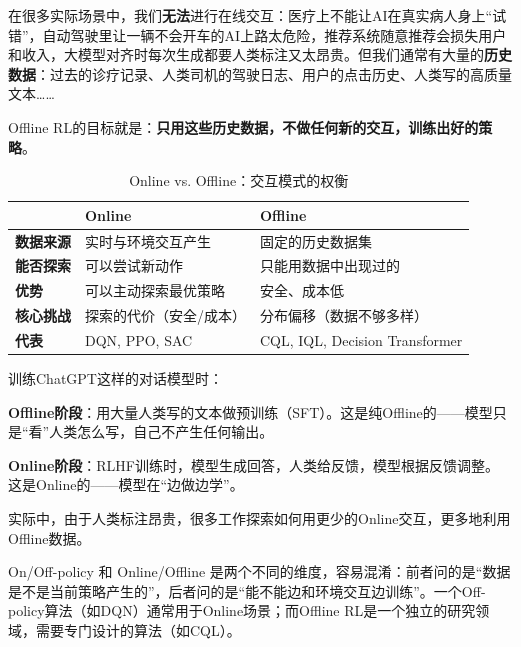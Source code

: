 在很多实际场景中，我们\textbf{无法}进行在线交互：医疗上不能让AI在真实病人身上“试错”，自动驾驶里让一辆不会开车的AI上路太危险，推荐系统随意推荐会损失用户和收入，大模型对齐时每次生成都要人类标注又太昂贵。但我们通常有大量的\textbf{历史数据}：过去的诊疗记录、人类司机的驾驶日志、用户的点击历史、人类写的高质量文本……

Offline RL的目标就是：\textbf{只用这些历史数据，不做任何新的交互，训练出好的策略}。

\begin{table}[htbp]
\centering
\renewcommand{\arraystretch}{1.3}
\small
\begin{tabularx}{\textwidth}{p{2cm}|X|X}
\toprule
& \textbf{Online} & \textbf{Offline} \\
\midrule
\textbf{数据来源} & 实时与环境交互产生 & 固定的历史数据集 \\
\textbf{能否探索} & 可以尝试新动作 & 只能用数据中出现过的 \\
\textbf{优势} & 可以主动探索最优策略 & 安全、成本低 \\
\textbf{核心挑战} & 探索的代价（安全/成本） & 分布偏移（数据不够多样） \\
\textbf{代表} & DQN, PPO, SAC & CQL, IQL, Decision Transformer \\
\bottomrule
\end{tabularx}
\caption{Online vs. Offline：交互模式的权衡}
\end{table}

\begin{example}
训练ChatGPT这样的对话模型时：

\textbf{Offline阶段}：用大量人类写的文本做预训练（SFT）。这是纯Offline的——模型只是“看”人类怎么写，自己不产生任何输出。

\textbf{Online阶段}：RLHF训练时，模型生成回答，人类给反馈，模型根据反馈调整。这是Online的——模型在“边做边学”。

实际中，由于人类标注昂贵，很多工作探索如何用更少的Online交互，更多地利用Offline数据。
\end{example}

\begin{remark}
On/Off-policy 和 Online/Offline 是两个不同的维度，容易混淆：前者问的是“数据是不是当前策略产生的”，后者问的是“能不能边和环境交互边训练”。一个Off-policy算法（如DQN）通常用于Online场景；而Offline RL是一个独立的研究领域，需要专门设计的算法（如CQL）。
\end{remark}

